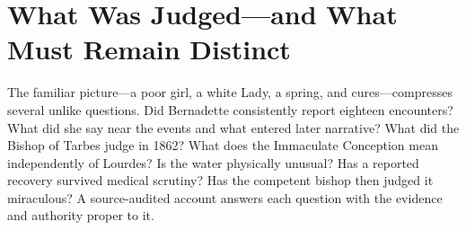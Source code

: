 \section{What Was Judged---and What Must Remain Distinct}


The familiar picture---a poor girl, a white Lady, a spring, and cures---compresses several unlike questions. Did Bernadette consistently report eighteen encounters? What did she say near the events and what entered later narrative? What did the Bishop of Tarbes judge in 1862? What does the Immaculate Conception mean independently of Lourdes? Is the water physically unusual? Has a reported recovery survived medical scrutiny? Has the competent bishop then judged it miraculous? A source-audited account answers each question with the evidence and authority proper to it.

